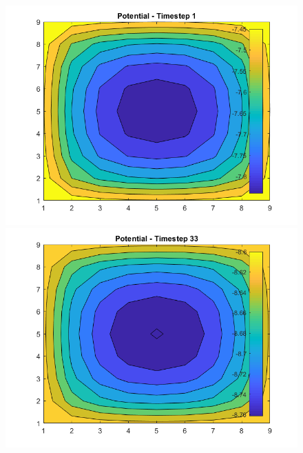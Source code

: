 \begin{figure}
    \centering
    \quad
  \begin{minipage}[b]{0.45\textwidth}
    \centering
    \includegraphics[width=\linewidth]{figures/potential_1.png}
  \end{minipage} %
  \begin{minipage}[b]{0.45\textwidth}
    \centering
    \includegraphics[width=\linewidth]{figures/potential_33.png}
  \end{minipage} %
  \begin{minipage}[b]{0.45\textwidth}
    \centering

\end{minipage}
\end{figure}
